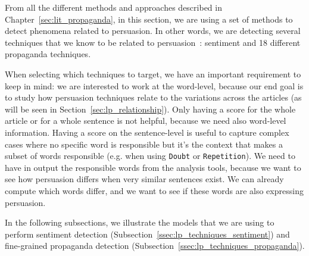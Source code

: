 
From all the different methods and approaches described in Chapter~\ref{sec:lit_propaganda}, in this section, we are using a set of methods to detect phenomena related to persuasion. %
In other words, we are detecting several techniques that we know 
to be related to persuasion~\citep{gass2018persuasion}: sentiment and 18 different propaganda techniques.%

When selecting which techniques to target, we have an important requirement to keep in mind: we are interested to work at the word-level, because our end goal is to study how persuasion techniques relate to the variations across the articles (as will be seen in Section~\ref{sec:lp_relationship}). Only having a score for the whole article or for a whole sentence is not helpful, because we need also word-level information. %
Having a score on the sentence-level is useful to capture complex cases where no specific word is responsible but it's the context that makes a subset of words responsible (e.g. when using \texttt{Doubt} or \texttt{Repetition}). We need to have in output the responsible words from the analysis tools, because we want to see how persuasion differs when very similar sentences exist. We can already compute which words differ, and we want to see if these words are also expressing persuasion.

In the following subsections, we illustrate the models that we are using to perform sentiment detection (Subsection~\ref{ssec:lp_techniques_sentiment}) and fine-grained propaganda detection (Subsection~\ref{ssec:lp_techniques_propaganda}).


